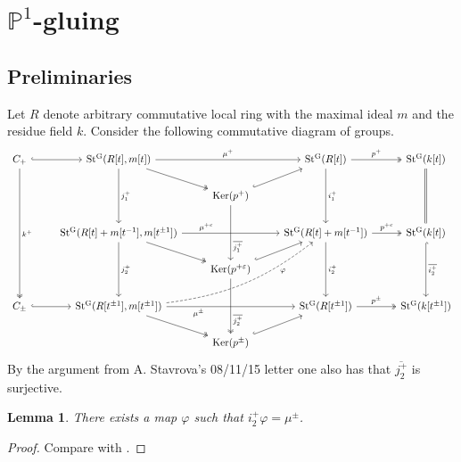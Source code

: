 \documentclass[oneside,12pt]{amsart}
\numberwithin{equation}{section}
\newtheorem{lem}{Lemma}
\numberwithin{lem}{section}
\theoremstyle{definition}
\theoremstyle{remark}
\DeclareMathOperator{\St}{St^G}
\newcommand{\Pro}{\mathbb{P}}
\begin{document}
\section{\texorpdfstring{$\Pro^1$}{P\textonesuperior}-gluing}
\subsection{Preliminaries}

Let $R$ denote arbitrary commutative local ring with the maximal ideal $m$ and the residue field $k$.
Consider the following commutative diagram of groups.
\[\begin{tikzcd} 
C_+ \ar[r, hookrightarrow] \ar[dddd, "k^+", twoheadrightarrow] & \St(R[t], m[t]) \ar[rd, twoheadrightarrow] \ar[rr, "\mu^+"] \ar[dd, "j^+_1"] & & \ar[dd, "i^+_1"] \St(R[t]) \ar[r, "p^+", twoheadrightarrow] & \St(k[t]) \ar[dd, equal] \\    
 &  & \mathrm{Ker}(p^+) \ar[ur, hookrightarrow] \ar[dd, "\overline{j^+_1}" near end] & &  \\    
 & \St(R[t] + m[t^{-1}], m[t^{\pm 1}]) \ar[rd, twoheadrightarrow] \ar[rr, "\mu^{+\varepsilon}" near start] \ar[dd, "j^+_2"] & & \ar[dd, "i^+_2"] \St(R[t]+m[t^{-1}]) \ar[r, "p^{+\varepsilon}", twoheadrightarrow] & \St(k[t]) \ar[dd, hookrightarrow, "\overline{i_2^+}"] \\     
 &  & \mathrm{Ker}(p^{+\varepsilon}) \ar[ur, hookrightarrow] \ar[dd, "\overline{j^+_2}" near end, twoheadrightarrow] & &  \\    
C_{\pm} \ar[r, hookrightarrow] & \St(R[t^{\pm 1}], m[t^{\pm 1}]) \ar[uurr, bend right=15, dashrightarrow, "\varphi"' near end] \ar[rd, twoheadrightarrow] \ar[rr, "\mu^\pm"' near start] &  & \St(R[t^{\pm 1}]) \ar[r, "p^\pm", twoheadrightarrow] & \St(k[t^{\pm 1}]) \\
 &  & \mathrm{Ker}(p^\pm) \ar[ur, hookrightarrow] & &  
\end{tikzcd}\]
By the argument from A. Stavrova's 08/11/15 letter one also has that $\overline{j^+_2}$ is surjective.

\begin{lem} \label{lem:TulDiagram} There exists a map $\varphi$ such that $ i_2^+ \varphi = \mu^\pm$. \end{lem}
\begin{proof}
 Compare with \cite[Lemma~3.2]{Tu}.  
\end{proof}
\end{document}
